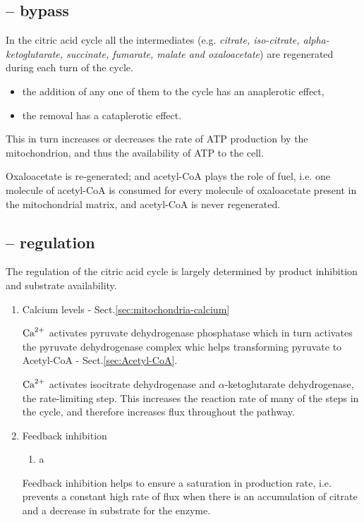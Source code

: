 
\subsection{-- bypass}
\label{sec:krebs-cycle-bypass}

In the citric acid cycle all the intermediates (e.g. {\it citrate, iso-citrate,
alpha-ketoglutarate, succinate, fumarate, malate and oxaloacetate}) are
regenerated during each turn of the cycle.

\begin{itemize}
  \item  the addition of any one of them to the cycle has an anaplerotic effect,
  \item the removal has a cataplerotic effect.
\end{itemize}
This in turn increases or decreases the rate of ATP production by the
mitochondrion, and thus the availability of ATP to the cell.

Oxaloacetate is re-generated; and acetyl-CoA plays the role of fuel, i.e. one
molecule of acetyl-CoA is consumed for every molecule of oxaloacetate present in
the mitochondrial matrix, and acetyl-CoA is never regenerated.


\subsection{-- regulation}
\label{sec:krebs-cycle-regulation}

The regulation of the citric acid cycle is largely determined by product
inhibition and substrate availability.
\begin{enumerate}
  \item Calcium levels -  Sect.\ref{sec:mitochondria-calcium}

${\text{Ca}^{2+}}$ activates pyruvate dehydrogenase phosphatase which in turn activates the
pyruvate dehydrogenase complex whic helps transforming pyruvate to Acetyl-CoA -
Sect.\ref{sec:Acetyl-CoA}.

${\text{Ca}^{2+}}$ activates isocitrate dehydrogenase and $\alpha$-ketoglutarate
dehydrogenase, the rate-limiting step. This increases the reaction rate of many
of the steps in the cycle, and therefore increases flux throughout the pathway.

  \item Feedback inhibition
  \begin{enumerate}
    \item a
  \end{enumerate}
  Feedback inhibition helps to ensure a saturation in production rate, i.e.
  prevents a constant high rate of flux when there is an accumulation of citrate
  and a decrease in substrate for the enzyme.

\end{enumerate}


